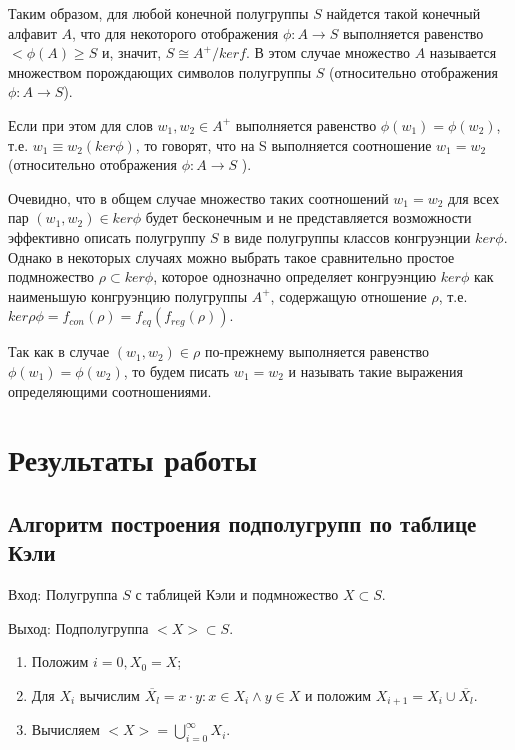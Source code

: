 \documentclass[bachelor, och, labwork]{shiza}
\begin{document}
	Таким образом, для любой конечной полугруппы $S$ найдется такой конечный алфавит $A$, что для некоторого отображения $\phi:A \to S$ выполняется равенство $< \phi(A) \geq S$ и, значит, $S \cong A^+/ker f$. В этом случае множество $A$ называется множеством порождающих символов полугруппы $S$ (относительно отображения $\phi: A \to S$).
	
	Если при этом для слов $w_1,w_2  \in A^+$ выполняется равенство $\phi(w_1)=\phi(w_2)$, т.е. $w_1 \equiv w_2 (ker \phi )$, то говорят, что на S выполняется соотношение $w_1=w_2$ (относительно отображения $\phi:A \to S$ ).
	
	Очевидно, что в общем случае множество таких соотношений $w_1  = w_2$ для всех пар $(w_1, w_2)\in ker \phi$ будет бесконечным и не представляется возможности эффективно описать полугруппу $S$ в виде полугруппы классов конгруэнции $ker \phi$. Однако в некоторых случаях можно выбрать такое сравнительно простое подмножество $\rho \subset ker \phi$, которое однозначно определяет конгруэнцию $ker \phi$ как наименьшую конгруэнцию полугруппы $A^+$, содержащую отношение $\rho$, т.е. $ker \rho \phi = f_{con} (\rho)=f_{eq} (f_{reg} (\rho))$.
	
	Так как в случае $(w_1,w_2) \in \rho$ по-прежнему выполняется равенство $\phi(w_1)=\phi(w_2)$, то будем писать $w_1=w_2$ и называть такие выражения определяющими соотношениями.

	\section{Результаты работы}
	
	\subsection{Алгоритм построения подполугрупп по таблице Кэли}
	
	$\textit{Вход:}$ Полугруппа $S$ с таблицей Кэли и подмножество $X \subset S$.

	$\textit{Выход:}$  Подполугруппа $<X> \subset S$.

	\begin{enumerate} 
		\item Положим $i = 0, X_0 = X$;
		\item Для $X_i$ вычислим $\overline{X_l} = {x \cdot y : x \in X_i \wedge y \in X}$ и положим $X_{i+1} = X_i \cup \overline{X_l}$.
		\item Вычисляем $<X> = \bigcup_{i=0}^{\infty} X_i$.
	\end{enumerate} 
	
\end{document}
